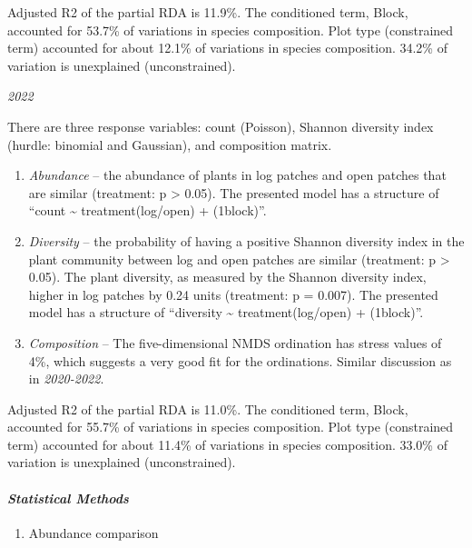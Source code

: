 \documentclass[
]{article}
\providecommand{\tightlist}{%
  \setlength{\itemsep}{0pt}\setlength{\parskip}{0pt}}
\begin{document}
Adjusted R2 of the partial RDA is 11.9\%. The conditioned term, Block,
accounted for 53.7\% of variations in species composition. Plot type
(constrained term) accounted for about 12.1\% of variations in species
composition. 34.2\% of variation is unexplained (unconstrained).

\emph{2022}

There are three response variables: count (Poisson), Shannon diversity
index (hurdle: binomial and Gaussian), and composition matrix.

\begin{enumerate}
\def\labelenumi{\arabic{enumi}.}
\tightlist
\item
  \emph{Abundance} -- the abundance of plants in log patches and open
  patches that are similar (treatment: p \textgreater{} 0.05). The
  presented model has a structure of ``count \textasciitilde{}
  treatment(log/open) + (1\textbar block)''.
\item
  \emph{Diversity} -- the probability of having a positive Shannon
  diversity index in the plant community between log and open patches
  are similar (treatment: p \textgreater{} 0.05). The plant diversity,
  as measured by the Shannon diversity index, higher in log patches by
  0.24 units (treatment: p = 0.007). The presented model has a structure
  of ``diversity \textasciitilde{} treatment(log/open) +
  (1\textbar block)''.
\item
  \emph{Composition} -- The five-dimensional NMDS ordination has stress
  values of 4\%, which suggests a very good fit for the ordinations.
  Similar discussion as in \emph{2020-2022}.
\end{enumerate}

Adjusted R2 of the partial RDA is 11.0\%. The conditioned term, Block,
accounted for 55.7\% of variations in species composition. Plot type
(constrained term) accounted for about 11.4\% of variations in species
composition. 33.0\% of variation is unexplained (unconstrained).

\hypertarget{statistical-methods}{%
\paragraph{\texorpdfstring{\emph{Statistical Methods}
}{Statistical Methods  }}\label{statistical-methods}}

\begin{enumerate}
\def\labelenumi{\arabic{enumi}.}
\tightlist
\item
  Abundance comparison
\end{enumerate}
\end{document}
